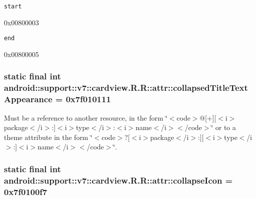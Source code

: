 {\tt start}

0x00800003

{\tt end}

0x00800005\hypertarget{classandroid_1_1support_1_1v7_1_1cardview_1_1_r_1_1attr_45f3b12ece98c9725d8ada72b4c0fdfc}{
\subsubsection[{collapsedTitleTextAppearance}]{\setlength{\rightskip}{0pt plus 5cm}static final int android::support::v7::cardview.R.R::attr::collapsedTitleTextAppearance = 0x7f010111}}
\label{classandroid_1_1support_1_1v7_1_1cardview_1_1_r_1_1attr_45f3b12ece98c9725d8ada72b4c0fdfc}


Must be a reference to another resource, in the form \char`\"{}$<$code$>$@\mbox{[}+\mbox{]}\mbox{[}$<$i$>$package$<$/i$>$:\mbox{]}$<$i$>$type$<$/i$>$:$<$i$>$name$<$/i$>$$<$/code$>$\char`\"{} or to a theme attribute in the form \char`\"{}$<$code$>$?\mbox{[}$<$i$>$package$<$/i$>$:\mbox{]}\mbox{[}$<$i$>$type$<$/i$>$:\mbox{]}$<$i$>$name$<$/i$>$$<$/code$>$\char`\"{}. \hypertarget{classandroid_1_1support_1_1v7_1_1cardview_1_1_r_1_1attr_98ecebc6ad805eec7bda4b28cfd6f6cc}{
\subsubsection[{collapseIcon}]{\setlength{\rightskip}{0pt plus 5cm}static final int android::support::v7::cardview.R.R::attr::collapseIcon = 0x7f0100f7}}
\label{classandroid_1_1support_1_1v7_1_1cardview_1_1_r_1_1attr_98ecebc6ad805eec7bda4b28cfd6f6cc}


